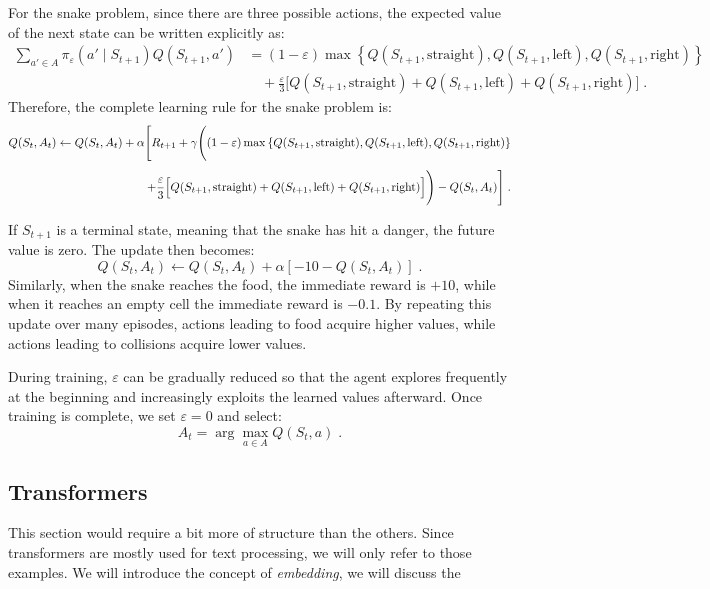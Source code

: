 \documentclass[12pt,a4paper]{article}
\begin{document}
For the snake problem, since there are three possible actions, the expected value of the next state can be written explicitly as:
\begin{align*}
	\sum_{a'\in A}
	\pi_\varepsilon(a'\mid S_{t+1})
	Q(S_{t+1},a')
	&=
	(1-\varepsilon)
	\max
	\left\{
	Q(S_{t+1},\text{straight}),
	Q(S_{t+1},\text{left}),
	Q(S_{t+1},\text{right})
	\right\} \\[4pt]
	&\quad+
	\frac{\varepsilon}{3}
	\Big[
	Q(S_{t+1},\text{straight})
	+
	Q(S_{t+1},\text{left})
	+
	Q(S_{t+1},\text{right})
	\Big]\;.
\end{align*}
Therefore, the complete learning rule for the snake problem is:
\begin{align*}
	Q(S_t,A_t)
	\leftarrow
	Q(S_t,A_t)
	+
	\alpha
	\Bigg[
	R_{t+1}
	+
	\gamma
	\Bigg(
	(1-\varepsilon)
	\max
	\left\{
	Q(S_{t+1},\text{straight}),
	Q(S_{t+1},\text{left}),
	Q(S_{t+1},\text{right})
	\right\} \\[4pt]
	\hspace{3.2cm}
	+
	\frac{\varepsilon}{3}
	\Big[
	Q(S_{t+1},\text{straight})
	+
	Q(S_{t+1},\text{left})
	+
	Q(S_{t+1},\text{right})
	\Big]
	\Bigg)
	-
	Q(S_t,A_t)
	\Bigg]\;.
\end{align*}

If $S_{t+1}$ is a terminal state, meaning that the snake has hit a danger, the future value is zero. The update then becomes:
$$
Q(S_t,A_t)
\leftarrow
Q(S_t,A_t)
+
\alpha
\left[
-10-Q(S_t,A_t)
\right]\;.
$$
Similarly, when the snake reaches the food, the immediate reward is $+10$, while when it reaches an empty cell the immediate reward is $-0.1$. By repeating this update over many episodes, actions leading to food acquire higher values, while actions leading to collisions acquire lower values.

During training, $\varepsilon$ can be gradually reduced so that the agent explores frequently at the beginning and increasingly exploits the learned values afterward. Once training is complete, we set $\varepsilon=0$ and select:
$$
A_t=\arg\max_{a\in A}Q(S_t,a)\;.
$$


\subsection{Transformers}
This section would require a bit more of structure than the others. Since transformers are mostly used for text processing, we will only refer to those examples. We will introduce the concept of \textit{embedding}, we will discuss the 
\end{document}
